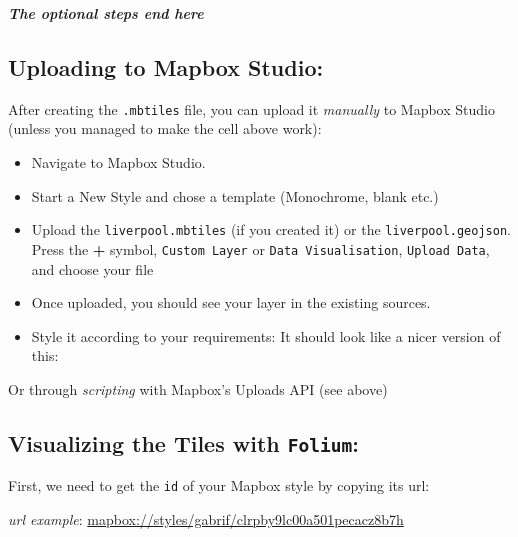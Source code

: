\documentclass[
  letterpaper,
  DIV=11,
  numbers=noendperiod]{scrreprt}
\providecommand{\tightlist}{%
  \setlength{\itemsep}{0pt}\setlength{\parskip}{0pt}}\usepackage{longtable,booktabs,array}
\begin{document}
\textbf{\emph{The optional steps end here}}

\subsection{\texorpdfstring{Uploading to \textbf{Mapbox
Studio}:}{Uploading to Mapbox Studio:}}\label{uploading-to-mapbox-studio}

After creating the \texttt{.mbtiles} file, you can upload it
\emph{manually} to Mapbox Studio (unless you managed to make the cell
above work):

\begin{itemize}
\tightlist
\item
  Navigate to Mapbox Studio.
\item
  Start a New Style and chose a template (Monochrome, blank etc.)
\end{itemize}

\begin{itemize}
\tightlist
\item
  Upload the \texttt{liverpool.mbtiles} (if you created it) or the
  \texttt{liverpool.geojson}. Press the \textbf{+} symbol,
  \texttt{Custom\ Layer} or \texttt{Data\ Visualisation},
  \texttt{Upload\ Data}, and choose your file
\end{itemize}

\begin{itemize}
\tightlist
\item
  Once uploaded, you should see your layer in the existing sources.
\end{itemize}

\begin{itemize}
\tightlist
\item
  Style it according to your requirements: It should look like a nicer
  version of this:
\end{itemize}

Or through \emph{scripting} with Mapbox's Uploads API (see above)

\subsection{\texorpdfstring{Visualizing the Tiles with
\texttt{Folium}:}{Visualizing the Tiles with Folium:}}\label{visualizing-the-tiles-with-folium}

First, we need to get the \texttt{id} of your Mapbox style by copying
its url:

\emph{url example}:
\url{mapbox://styles/gabrif/clrpby9lc00a501pecacz8b7h}
\end{document}

